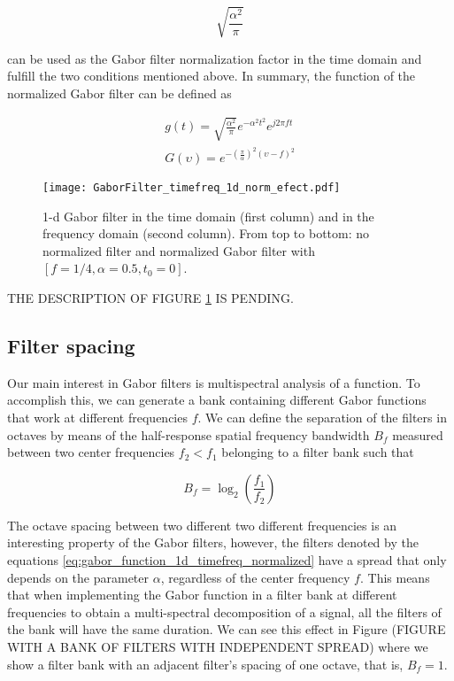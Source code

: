 \begin{equation}\label{eq:normalization_factor}
    \sqrt{\frac{\alpha^2}{\pi}}
\end{equation}

can be used as the Gabor filter normalization factor in the time domain and fulfill the two conditions mentioned above. In summary, the function of the normalized Gabor filter can be defined as

\begin{equation}\label{eq:gabor_function_1d_timefreq_normalized}
    \begin{gathered}
         g(t) =  \sqrt{\frac{\alpha^2}{\pi}} e ^{-\alpha^2 t^2} e ^{j 2 \pi f t } \\
         G(\upsilon) =  e ^{-\left(\frac{\pi}{\alpha}\right) ^2 (\upsilon-f)^2}
     \end{gathered}
\end{equation}

\begin{figure}
\centering
\texttt{[image: GaborFilter\_timefreq\_1d\_norm\_efect.pdf]}
\caption{1-d Gabor filter in the time domain (first column) and in the frequency domain (second  column). From top to bottom: no normalized filter and normalized Gabor filter with $[f =1/4,\alpha=0.5, t_0=0]$.}\label{fig:GaborFilter_timefreq_norm_efect}
\end{figure}

THE DESCRIPTION OF FIGURE \ref{fig:GaborFilter_timefreq_norm_efect} IS PENDING.

\subsection{Filter spacing}

Our main interest in Gabor filters is multispectral analysis of a function. To accomplish this, we can generate a bank containing different Gabor functions that work at different frequencies $f$. We can define the separation of the filters in octaves by means of the half-response spatial frequency bandwidth $B_f$ measured between two center frequencies $f_2 < f_1$ \cite{Granlund:CGIP:1978} belonging to a filter bank such that 

\begin{equation}\label{eq:octave_spacing}
    B_f = \log_2 \left( \frac{f_1}{f_2} \right)
\end{equation}

The octave spacing between two different two different frequencies is an interesting property of the Gabor filters, however, the filters denoted by the equations \eqref{eq:gabor_function_1d_timefreq_normalized} have a spread that only depends on the parameter $\alpha$, regardless of the center frequency $f$. This means that when implementing the Gabor function in a filter bank at different frequencies to obtain a multi-spectral decomposition of a signal, all the filters of the bank will have the same duration. We can see this effect in Figure (FIGURE WITH A BANK OF FILTERS WITH INDEPENDENT SPREAD) where we show a filter bank with an adjacent filter's spacing of one octave, that is, $B_f = 1$. 


